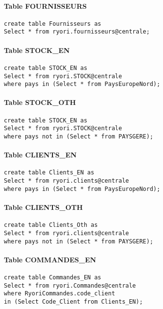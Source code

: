 \documentclass[10pt,a4paper,twoside]{article}
\begin{document}
\paragraph{Table FOURNISSEURS}
\begin{verbatim}
create table Fournisseurs as
Select * from ryori.fournisseurs@centrale;
\end{verbatim}

\paragraph{Table STOCK\_EN}
\begin{verbatim}
create table STOCK_EN as
Select * from ryori.STOCK@centrale
where pays in (Select * from PaysEuropeNord);
\end{verbatim}

\paragraph{Table STOCK\_OTH}
\begin{verbatim}
create table STOCK_EN as
Select * from ryori.STOCK@centrale
where pays not in (Select * from PAYSGERE);
\end{verbatim}

\paragraph{Table CLIENTS\_EN}
\begin{verbatim}
create table Clients_EN as
Select * from ryori.clients@centrale
where pays in (Select * from PaysEuropeNord);
\end{verbatim}

\paragraph{Table CLIENTS\_OTH}
\begin{verbatim}
create table Clients_Oth as
Select * from ryori.clients@centrale
where pays not in (Select * from PAYSGERE);
\end{verbatim}

\paragraph{Table COMMANDES\_EN}
\begin{verbatim}
create table Commandes_EN as
Select * from ryori.Commandes@centrale
where RyoriCommandes.code_client 
in (Select Code_Client from Clients_EN);
\end{verbatim}
\end{document}
